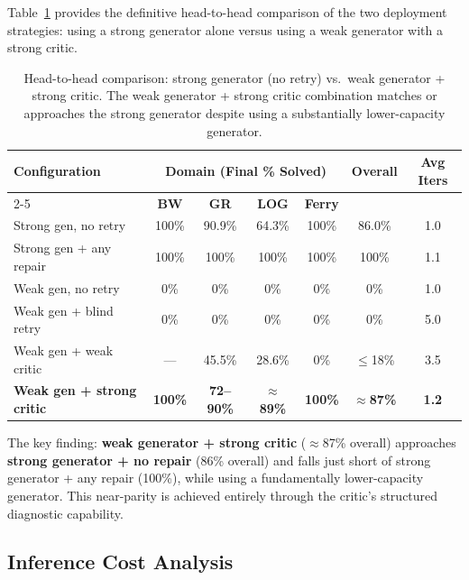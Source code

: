 \documentclass{article}
\begin{document}
Table~\ref{tab:head_to_head} provides the definitive head-to-head comparison of the
two deployment strategies: using a strong generator alone versus using a weak
generator with a strong critic.

\begin{table}[h]
\centering
\caption{Head-to-head comparison: strong generator (no retry) vs.\ weak generator + strong critic.
         The weak generator + strong critic combination matches or approaches the strong generator
         despite using a substantially lower-capacity generator.}
\label{tab:head_to_head}
\begin{tabular}{lcccccc}
\toprule
\multirow{2}{*}{\textbf{Configuration}} &
  \multicolumn{4}{c}{\textbf{Domain (Final \% Solved)}} &
  \multirow{2}{*}{\textbf{Overall}} &
  \multirow{2}{*}{\textbf{Avg Iters}} \\
\cmidrule{2-5}
  & \textbf{BW} & \textbf{GR} & \textbf{LOG} & \textbf{Ferry} & & \\
\midrule
Strong gen, no retry          & 100\% & 90.9\% & 64.3\%  & 100\% & 86.0\% & 1.0 \\
Strong gen + any repair       & 100\% & 100\%  & 100\%   & 100\% & 100\%  & 1.1 \\
\midrule
Weak gen, no retry            & 0\%   & 0\%    & 0\%     & 0\%   & 0\%    & 1.0 \\
Weak gen + blind retry        & 0\%   & 0\%    & 0\%     & 0\%   & 0\%    & 5.0 \\
Weak gen + weak critic        & ---   & 45.5\% & 28.6\%  & 0\%   & $\leq$18\% & 3.5 \\
\textbf{Weak gen + strong critic} & \textbf{100\%} & \textbf{72--90\%} & $\approx$\textbf{89\%} & \textbf{100\%} & $\approx$\textbf{87\%} & \textbf{1.2} \\
\bottomrule
\end{tabular}
\end{table}

The key finding: \textbf{weak generator + strong critic} ($\approx$87\% overall)
approaches \textbf{strong generator + no repair} (86\% overall) and falls just short
of strong generator + any repair (100\%), while using a fundamentally lower-capacity
generator.  This near-parity is achieved entirely through the critic's structured
diagnostic capability.

\subsection{Inference Cost Analysis}
\label{sec:cost}
\end{document}
